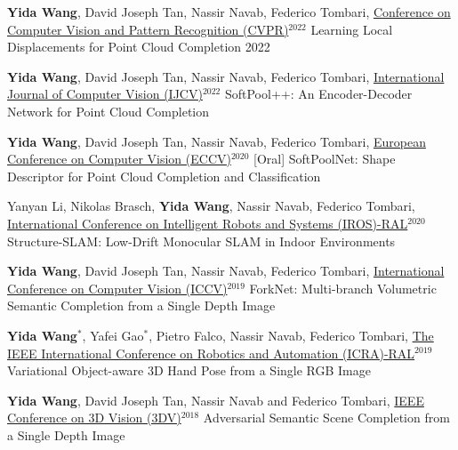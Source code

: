 \begin{cventries}
\begin{enumerate}[label={[\arabic*]}, leftmargin=*]
\item 
\cvpublication
{\textbf{Yida Wang}, David Joseph Tan, Nassir Navab, Federico Tombari, \underline{Conference on Computer Vision and Pattern Recognition (CVPR)}$^{2022}$} 
{Learning Local Displacements for Point Cloud Completion} %
{2022} %
{} %
{} %

\item 
\cvpublication
{\textbf{Yida Wang}, David Joseph Tan, Nassir Navab, Federico Tombari, \underline{International Journal of Computer Vision (IJCV)}$^{2022}$} %
{SoftPool++: An Encoder-Decoder Network for Point Cloud Completion} %
{} %
{} %

\item 
\cvpublication
{\textbf{Yida Wang}, David Joseph Tan, Nassir Navab, Federico Tombari, \underline{European Conference on Computer Vision (ECCV)}$^{2020}$ [Oral] \href{https://www.youtube.com/watch?v=zw4NlyxWlBg}{}} %
{SoftPoolNet: Shape Descriptor for Point Cloud Completion and Classification} %
{} %
{} %

\item 
\cvpublication
{Yanyan Li, Nikolas Brasch, \textbf{Yida Wang}, Nassir Navab, Federico Tombari, \underline{International Conference on Intelligent Robots and Systems (IROS)-RAL}$^{ 2020}$} %
{Structure-SLAM: Low-Drift Monocular SLAM in Indoor Environments} %
{} %
{} %

\item 
\cvpublication
{\textbf{Yida Wang}, David Joseph Tan, Nassir Navab, Federico Tombari, \underline{International Conference on Computer Vision (ICCV)}$^{2019}$} %
{ForkNet: Multi-branch Volumetric Semantic Completion from a Single Depth Image} %
{} %
{} %

\item 
\cvpublication
{\textbf{Yida Wang}$^*$, Yafei Gao$^*$, Pietro Falco, Nassir Navab, Federico Tombari, \underline{The IEEE International Conference on Robotics and Automation (ICRA)-RAL}$^{2019}$ \href{https://www.youtube.com/watch?v=tSTQ2NTqB4A}{}} %
{Variational Object-aware 3D Hand Pose from a Single RGB Image} %
{} %
{} %

\item 
\cvpublication
{\textbf{Yida Wang}, David Joseph Tan, Nassir Navab and Federico Tombari, \underline{IEEE Conference on 3D Vision (3DV)}$^{2018}$ \href{https://www.youtube.com/watch?v=udvBhkupwXE&t=1s}{}} %
{Adversarial Semantic Scene Completion from a Single Depth Image} %
{} %
{} %


\end{enumerate}
\end{cventries}
